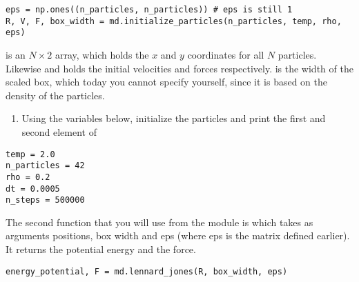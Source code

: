 \documentclass{article}
\begin{document}
\begin{lstlisting}
eps = np.ones((n_particles, n_particles)) # eps is still 1
R, V, F, box_width = md.initialize_particles(n_particles, temp, rho, eps)
\end{lstlisting}

 is an $N\times2$ array, which holds the $x$ and $y$ coordinates for all $N$ particles.
Likewise  and  holds the initial velocities and forces respectively.
 is the width of the scaled box, which today you cannot specify yourself,
since it is based on the density of the particles.\\

\begin{enumerate}[resume]
\item Using the variables below, initialize the particles and print the first and second element of  \label{item:print R}
\end{enumerate}
\begin{lstlisting}
temp = 2.0
n_particles = 42
rho = 0.2
dt = 0.0005
n_steps = 500000
\end{lstlisting}
 

The second function that you will use from the  module is  which takes as arguments positions, box width and eps (where eps is the matrix defined earlier).
It returns the potential energy and the force.

\begin{lstlisting}
energy_potential, F = md.lennard_jones(R, box_width, eps)
\end{lstlisting}
\end{document}
